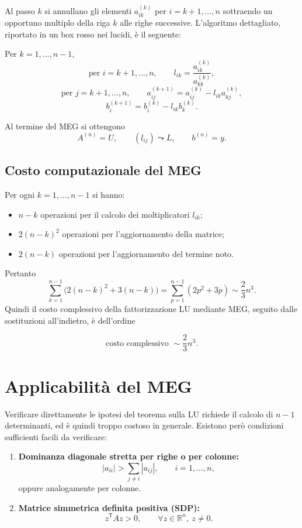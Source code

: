 \documentclass[11pt,a4paper]{report}
\newcommand{\R}{\mathbb{R}}
\newcommand{\trans}{^{\mathsf T}}
\begin{document}
Al passo $k$ si annullano gli elementi $a_{ik}^{(k)}$ per $i=k+1,\dots,n$ sottraendo un opportuno multiplo della riga $k$ alle righe successive.
L'algoritmo dettagliato, riportato in un box rosso nei lucidi, \`e il seguente:

\begin{nonExamBox}
Per $k=1,\dots,n-1$,
\[
\text{per } i=k+1,\dots,n,
\qquad
l_{ik}=\frac{a_{ik}^{(k)}}{a_{kk}^{(k)}},
\]
\[
\text{per } j=k+1,\dots,n,
\qquad
 a_{ij}^{(k+1)}=a_{ij}^{(k)}-l_{ik}a_{kj}^{(k)},
\]
\[
 b_i^{(k+1)}=b_i^{(k)}-l_{ik}b_k^{(k)}.
\]
\end{nonExamBox}
Al termine del MEG si ottengono
\[
A^{(n)}=U,
\qquad
(l_{ij})\leadsto L,
\qquad
b^{(n)}=y.
\]

\subsection{Costo computazionale del MEG}
Per ogni $k=1,\dots,n-1$ si hanno:
\begin{itemize}
  \item $n-k$ operazioni per il calcolo dei moltiplicatori $l_{ik}$;
  \item $2(n-k)^2$ operazioni per l'aggiornamento della matrice;
  \item $2(n-k)$ operazioni per l'aggiornamento del termine noto.
\end{itemize}
Pertanto
\[
\sum_{k=1}^{n-1}\big(2(n-k)^2+3(n-k)\big)
=\sum_{p=1}^{n-1}(2p^2+3p)
\sim \frac{2}{3}n^3.
\]
Quindi il costo complessivo della fattorizzazione LU mediante MEG, seguito dalle sostituzioni all'indietro, \`e dell'ordine
\begin{formulaBox}
\[
\text{costo complessivo }\sim \frac{2}{3}n^3.
\]
\end{formulaBox}

\section{Applicabilit\`a del MEG}
Verificare direttamente le ipotesi del teorema sulla LU richiede il calcolo di $n-1$ determinanti, ed \`e quindi troppo costoso in generale.
Esistono per\`o condizioni sufficienti facili da verificare:
\begin{enumerate}[label=\arabic*)]
  \item \textbf{Dominanza diagonale stretta per righe o per colonne:}
  \[
  |a_{ii}|>\sum_{j\neq i}|a_{ij}|,
  \qquad i=1,\dots,n,
  \]
  oppure analogamente per colonne.
  \item \textbf{Matrice simmetrica definita positiva (SDP):}
  \[
  z\trans Az>0,
  \qquad \forall z\in\R^n,\ z\neq 0.
  \]
\end{enumerate}
\end{document}
